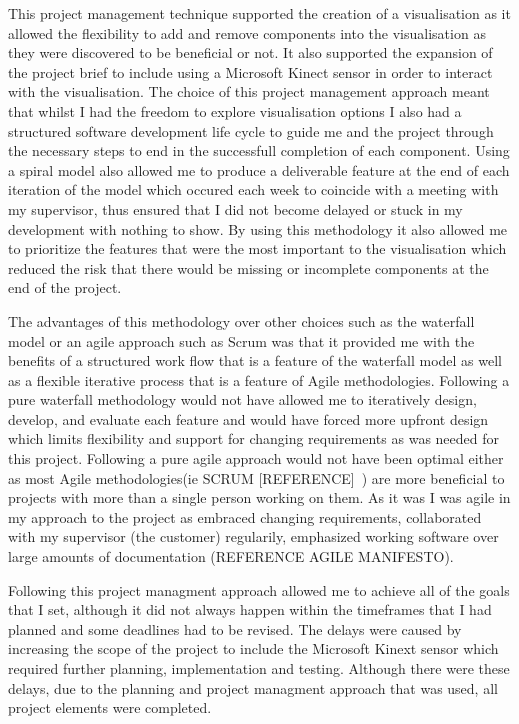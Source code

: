 This project management technique supported the creation of a visualisation as
it allowed the flexibility to add and remove components into the visualisation
as they were discovered to be beneficial or not. It also supported the expansion
of the project brief to include using a Microsoft Kinect sensor in order to
interact with the visualisation. The choice of this project management approach
meant that whilst I had the freedom to explore visualisation options I also had
a structured software development life cycle to guide me and the project through the necessary steps to end in the successfull completion of each
component.
%
Using a spiral model also allowed me to produce a deliverable feature at the end
of each iteration of the model which occured each week to coincide with a
meeting with my supervisor, thus ensured that I did not become delayed or stuck
in my development with nothing to show. By using this methodology it also
allowed me to prioritize the features that were the most important to the
visualisation which reduced the risk that there would be missing or incomplete
components at the end of the project. 

The advantages of this methodology over other choices such as the waterfall
model or an agile approach such as Scrum was that it provided me with the
benefits of a structured work flow that is a feature of the waterfall model as
well as a flexible iterative process that is a feature of Agile methodologies.
Following a pure waterfall methodology would not have allowed me to iteratively
design, develop, and evaluate each feature and would have forced more upfront
design which limits flexibility and support for changing requirements as was
needed for this project. Following a pure agile approach would not have been
optimal either as most Agile methodologies(ie SCRUM [REFERENCE]~) are more
beneficial to projects with more than a single person working on them. As it was
I was agile in my approach to the project as embraced changing requirements,
collaborated with my supervisor (the customer) regularily, emphasized working
software over large amounts of documentation (REFERENCE AGILE MANIFESTO). 

Following this project managment approach allowed me to achieve all of the goals
that I set, although it did not always happen within the timeframes that I had
planned and some deadlines had to be revised. The delays were caused by
increasing the scope of the project to include the Microsoft Kinext sensor which
required further planning, implementation and testing. Although there were these
delays, due to the planning and project managment approach that was used, all
project elements were completed.

